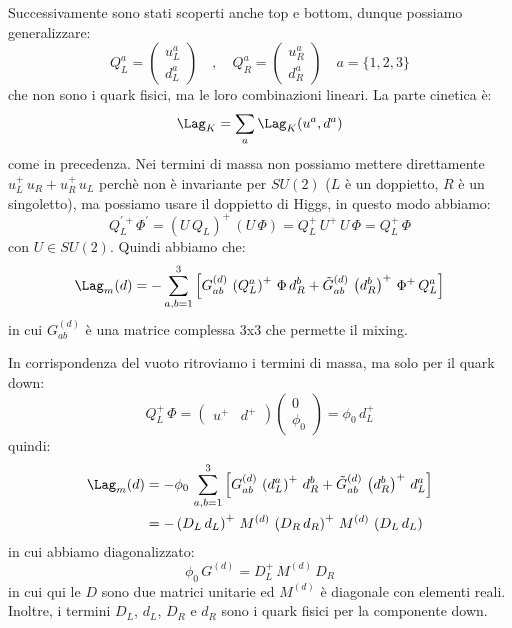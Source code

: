 Successivamente sono stati scoperti anche top e bottom, dunque possiamo generalizzare:
\begin{equation}
    Q_L^a = \begin{pmatrix}
        u_L^a \\
        d_L^a
    \end{pmatrix} \quad , \quad Q_R^a = \begin{pmatrix}
        u_R^a \\
        d_R^a
    \end{pmatrix} \quad a=\{1,2,3\}
\end{equation}
che non sono i quark fisici, ma le loro combinazioni lineari. La parte cinetica è:
\begin{equation}
    \Lag_K = \sum_a \Lag_K(u^a,d^a)
\end{equation}
come in precedenza. Nei termini di massa non possiamo mettere direttamente $u^+_L\, u_R + u^+_R\, u_L$ perchè non è invariante per $SU(2)$ ($L$ è un doppietto, $R$ è un singoletto), ma possiamo usare il doppietto di Higgs, in questo modo abbiamo:
\begin{equation}
    Q_L^{\prime +} \Phi^\prime = \left( U\, Q_L \right)^+\, \left( U\, \Phi \right) = Q_L^+\, U^+\, U\, \Phi = Q_L^+\, \Phi
\end{equation}
con $U\in SU(2)$. Quindi abbiamo che:
\begin{equation}
    \Lag_m(d) = -\sum_{a,b=1}^3 \Big[ G_{ab}^{(d)}\, \left( Q_L^a \right)^+\, \Phi\, d_R^b + \tilde{G}_{ab}^{(d)}\, \left(d_R^b\right)^+\, \Phi^+\, Q_L^a \Big]
\end{equation}
in cui $G_{ab}^{(d)}$ è una matrice complessa 3x3 che permette il mixing.

In corrispondenza del vuoto ritroviamo i termini di massa, ma solo per il quark down:
\begin{equation}
    Q_L^+\, \Phi = \begin{pmatrix}
        u^+ & d^+
    \end{pmatrix}\begin{pmatrix}
        0 \\
        \phi_0
    \end{pmatrix} = \phi_0\, d_L^+
\end{equation}
quindi:
\begin{align}
    \Lag_m(d) &= -\phi_0\, \sum_{a,b=1}^3 \Big[ G_{ab}^{(d)}\, \left( d_L^a \right)^+\, d_R^b + \tilde{G}_{ab}^{(d)}\, \left(d_R^b\right)^+\, d_L^a \Big] \\
    &= -\left(D_L\, d_L\right)^+\, M^{(d)}\, \left(D_R\, d_R\right)^+\, M^{(d)}\, \left(D_L\, d_L\right)
\end{align}
in cui abbiamo diagonalizzato:
\begin{equation}
    \phi_0\, G^{(d)} = D_L^+\, M^{(d)}\, D_R
\end{equation}
in cui qui le $D$ sono due matrici unitarie ed $M^{(d)}$ è diagonale con elementi reali. Inoltre, i termini $D_L$, $d_L$, $D_R$ e $d_R$ sono i quark fisici per la componente down.

